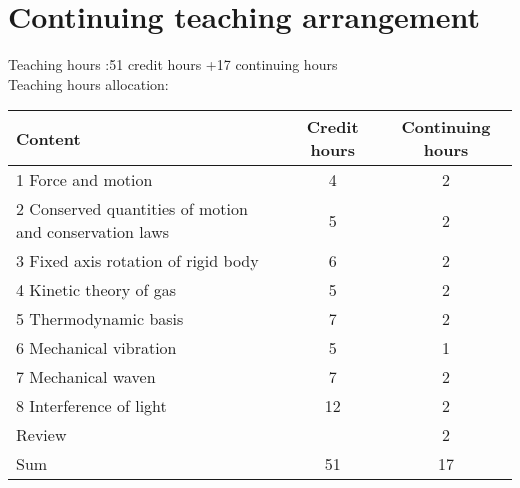 \documentclass[10pt,a4paper,oneside]{article}
\begin{document}
\section{Continuing teaching arrangement}
Teaching hours :51 credit hours +17 continuing hours\\
Teaching hours allocation:\\
\begin{center}
\begin{tabular}{|l|c|c|} %
	\hline 
	Content&Credit hours&Continuing hours\\
	\hline  
	1 Force and motion&4&2\\
	\hline 
	2 Conserved quantities of motion and conservation laws&5&2\\
	\hline 
	3 Fixed axis rotation of rigid body&6&2\\
	\hline 
	4 Kinetic theory of gas&5&2\\
	\hline 
	5 Thermodynamic basis&7&2\\
	\hline 
	6 Mechanical vibration&5&1\\
	\hline 
	7 Mechanical waven&7&2\\
	\hline 
	8 Interference of light&12&2\\
	\hline 
	Review&&2\\
	\hline 
	Sum&51&17\\
	\hline 
\end{tabular}
\end{center}
\end{document}
